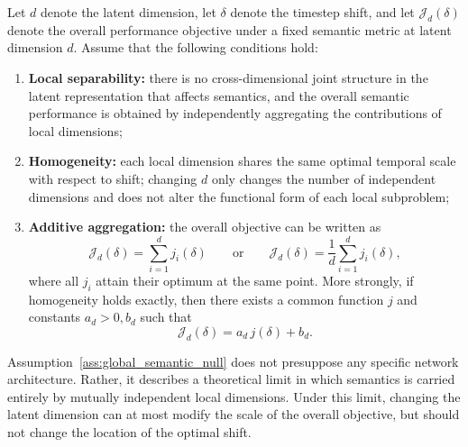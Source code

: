 \begin{assumption}
\label{ass:global_semantic_null}
Let $d$ denote the latent dimension, let $\delta$ denote the timestep shift, and let $\mathcal J_d(\delta)$ denote the overall performance objective under a fixed semantic metric at latent dimension $d$. Assume that the following conditions hold:
\begin{enumerate}
    \item \textbf{Local separability:} there is no cross-dimensional joint structure in the latent representation that affects semantics, and the overall semantic performance is obtained by independently aggregating the contributions of local dimensions;
    \item \textbf{Homogeneity:} each local dimension shares the same optimal temporal scale with respect to shift; changing $d$ only changes the number of independent dimensions and does not alter the functional form of each local subproblem;
    \item \textbf{Additive aggregation:} the overall objective can be written as
    \begin{equation}
    \mathcal J_d(\delta)=\sum_{i=1}^{d} j_i(\delta)
    \qquad\text{or}\qquad
    \mathcal J_d(\delta)=\frac{1}{d}\sum_{i=1}^{d} j_i(\delta),
    \label{eq:separable_objective}
    \end{equation}
    where all $j_i$ attain their optimum at the same point. More strongly, if homogeneity holds exactly, then there exists a common function $j$ and constants $a_d>0,b_d$ such that
    \begin{equation}
    \mathcal J_d(\delta)=a_d\,j(\delta)+b_d.
    \label{eq:affine_common_profile}
    \end{equation}
\end{enumerate}
\end{assumption}

Assumption~\ref{ass:global_semantic_null} does not presuppose any specific network architecture. Rather, it describes a theoretical limit in which semantics is carried entirely by mutually independent local dimensions. Under this limit, changing the latent dimension can at most modify the scale of the overall objective, but should not change the location of the optimal shift.

